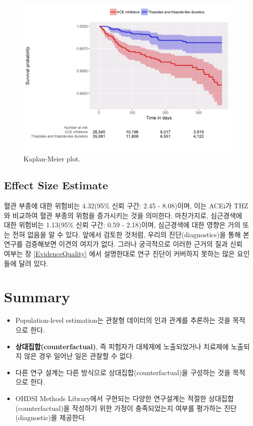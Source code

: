 \documentclass[11pt]{book}
\theoremstyle{definition}
\theoremstyle{definition}
\theoremstyle{definition}
\theoremstyle{remark}
\let\BeginKnitrBlock\begin \let\EndKnitrBlock\end
\begin{document}
\begin{figure}

{\centering \includegraphics[width=1\linewidth]{images/PopulationLevelEstimation/kmPlot} 

}

\caption{Kaplan-Meier plot.}\label{fig:kmPlot}
\end{figure}

\subsection{Effect Size Estimate}\label{effect-size-estimate}

혈관 부종에 대한 위험비는 4.32(95\% 신뢰 구간: 2.45 - 8.08)이며, 이는
ACEi가 THZ와 비교하여 혈관 부종의 위험을 증가시키는 것을 의미한다.
마찬가지로, 심근경색에 대한 위험비는 1.13(95\% 신뢰 구간: 0.59 -
2.18)이며, 심근경색에 대한 영향은 거의 또는 전혀 없음을 알 수 있다.
앞에서 검토한 것처럼, 우리의 진단(diagnostics)을 통해 본 연구를
검증해보면 이견의 여지가 없다. 그러나 궁극적으로 이러한 근거의 질과 신뢰
여부는 장 \ref{EvidenceQuality} 에서 설명한대로 연구 진단이 커버하지
못하는 많은 요인들에 달려 있다.

\section{Summary}\label{summary-7}

\BeginKnitrBlock{rmdsummary}
\begin{itemize}
\item
  Population-level estimation는 관찰형 데이터의 인과 관계를 추론하는
  것을 목적으로 한다.
\item
  \textbf{상대집합(counterfactual)}, 즉 피험자가 대체제에 노출되었거나
  치료제에 노출되지 않은 경우 일어난 일은 관찰할 수 없다.
\item
  다른 연구 설계는 다른 방식으로 상대집합(counterfactual)을 구성하는
  것을 목적으로 한다.
\item
  OHDSI Methods Library에서 구현되는 다양한 연구설계는 적절한
  상대집합(counterfactual)을 작성하기 위한 가정이 충족되었는지 여부를
  평가하는 진단 (diagnostic)을 제공한다.
\end{itemize}
\EndKnitrBlock{rmdsummary}
\end{document}

